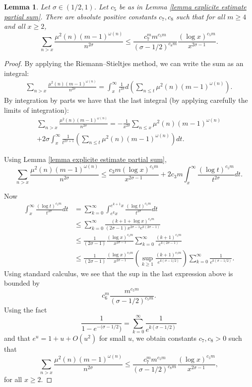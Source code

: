 \documentclass[reqno0,12pt]{amsart}
\newtheorem{lemma}{Lemma}[section]
\theoremstyle{remark}
\begin{document}
\begin{lemma}\label{lemma evaluacao da serie} Let $\sigma\in(1/2,1)$. Let $c_5$ be as in Lemma \ref{lemma explicite estimate partial sum}. There are absolute positive constants $c_7,c_8$ such that for all $m\geq 4$ and all $x\geq2$, 
$$\sum_{n>x}\frac{\mu^2(n)(m-1)^{\omega(n)}}{n^{2\sigma}}\leq \frac{c_7^m m^{c_5m}}{(\sigma-1/2)^{c_8m}}\frac{(\log x)^{c_5m}}{x^{2\sigma-1}}.$$
\end{lemma}
\begin{proof} By applying the Riemann--Stieltjes method, we can write the sum as an integral:
\begin{align*}
\sum_{n>x}\frac{\mu^2(n)(m-1)^{\omega(n)}}{n^{2\sigma}}=\int_x^\infty\frac{1}{t^{2\sigma}}d\left(\sum_{n\leq t}\mu^2(n)(m-1)^{\omega(n)}\right).
\end{align*}
By integration by parts we have that the last integral (by applying carefully the limits of integration):
\begin{multline*}
\sum_{n> x}\frac{\mu^2(n)(m-1)^{\omega(n)}}{n^{2\sigma}}=-\frac{1}{x^{2\sigma}}\sum_{n\leq x}\mu^2(n)(m-1)^{\omega(n)}\\+ 2\sigma\int_x^\infty\frac{1}{t^{2\sigma+1}}\left(\sum_{n\leq t}\mu^2(n)(m-1)^{\omega(n)}\right)dt.
\end{multline*}

Using Lemma \ref{lemma explicite estimate partial sum},
$$\sum_{n> x}\frac{\mu^2(n)(m-1)^{\omega(n)}}{n^{2\sigma}}\leq \frac{c_3m(\log x)^{c_5m}}{x^{2\sigma-1}}+ 2c_3m\int_{x}^\infty \frac{(\log t)^{c_5m}}{t^{2\sigma}}dt.$$

Now
\begin{align*}
\int_{x}^\infty \frac{(\log t)^{c_5m}}{t^{2\sigma}}dt&=\sum_{k=0}^\infty \int_{e^k x}^{e^{k+1}x}\frac{(\log t)^{c_5m}}{t^{2\sigma}}dt\\
&\leq \sum_{k=0}^{\infty} \frac{(k+1+\log x )^{c_5m}}{(2\sigma-1)x^{2\sigma-1}e^{k(2\sigma-1)}}\\
&\leq \frac{1}{(2\sigma-1)}\frac{(\log x)^{c_5m}}{x^{2\sigma-1}}\sum_{k=0}^\infty\frac{(k+1)^{c_5m}}{e^{k(2\sigma-1)}}\\
&\leq \frac{1}{(2\sigma-1)}\frac{(\log x)^{c_5m}}{x^{2\sigma-1}}\left(\sup_{k\geq 1}\frac{(k+1)^{c_5m}}{e^{k(\sigma-1/2)}}\right)\sum_{k=0}^\infty\frac{1}{e^{k(\sigma-1/2)}}.
\end{align*}
Using standard calculus, we see that the sup in the last expression above is bounded by
$$c_6^m \frac{m^{c_5m}}{(\sigma-1/2)^{c_5m}}.$$
Using the fact 
$$\frac{1}{1-e^{-(\sigma-1/2})}=\sum_{k=0}^\infty\frac{1}{e^{k(\sigma-1/2)}}$$
and that $e^u=1+u+O(u^2)$ for small $u$, we obtain constants $c_7,c_8>0$ such that
$$\sum_{n>x}\frac{\mu^2(n)(m-1)^{\omega(n)}}{n^{2\sigma}}\leq \frac{c_7^m m^{c_5m}}{(\sigma-1/2)^{c_8m}}\frac{(\log x)^{c_5m}}{x^{2\sigma-1}},$$
for all $x\geq 2$.
\end{proof}
\end{document}
